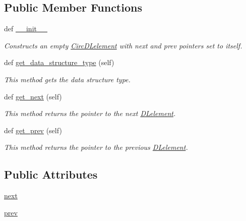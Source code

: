 \subsection*{Public Member Functions}
\begin{DoxyCompactItemize}
\item 
def \hyperlink{class_circ_d_lelement_1_1_circ_d_lelement_a9dd07008f966ac2b37cb6d678e13b27a}{\+\_\+\+\_\+init\+\_\+\+\_\+}
\begin{DoxyCompactList}\small\item\em Constructs an empty \hyperlink{class_circ_d_lelement_1_1_circ_d_lelement}{Circ\+D\+Lelement} with next and prev pointers set to itself. \end{DoxyCompactList}\item 
def \hyperlink{class_circ_d_lelement_1_1_circ_d_lelement_ab296525ea7f441251229b09645db81a4}{get\+\_\+data\+\_\+structure\+\_\+type} (self)
\begin{DoxyCompactList}\small\item\em This method gets the data structure type. \end{DoxyCompactList}\item 
def \hyperlink{class_circ_d_lelement_1_1_circ_d_lelement_ac6a27224354774b152abc3bd05bc8286}{get\+\_\+next} (self)
\begin{DoxyCompactList}\small\item\em This method returns the pointer to the next \hyperlink{namespace_d_lelement}{D\+Lelement}. \end{DoxyCompactList}\item 
def \hyperlink{class_circ_d_lelement_1_1_circ_d_lelement_afa343f86ca9a92571c2140d82b3850f0}{get\+\_\+prev} (self)
\begin{DoxyCompactList}\small\item\em This method returns the pointer to the previous \hyperlink{namespace_d_lelement}{D\+Lelement}. \end{DoxyCompactList}\end{DoxyCompactItemize}
\subsection*{Public Attributes}
\begin{DoxyCompactItemize}
\item 
\hyperlink{class_circ_d_lelement_1_1_circ_d_lelement_a58f067bcf3daa5c7a0e944bc91961af9}{next}
\item 
\hyperlink{class_circ_d_lelement_1_1_circ_d_lelement_a71d1419a7eb3687a3351e5ea0bcd55b4}{prev}
\end{DoxyCompactItemize}
